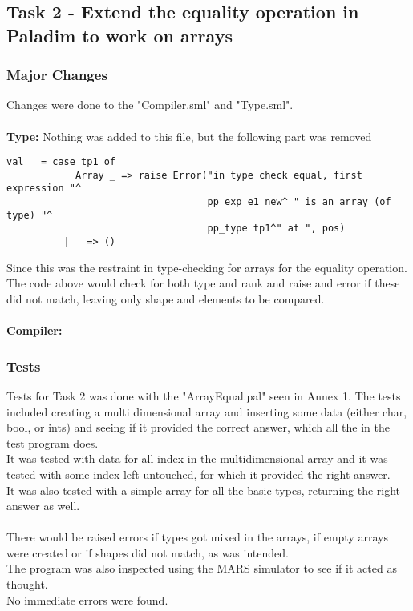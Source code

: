 \documentclass[12pt]{article}
\begin{document}
\newpage

\subsection*{Task 2 - Extend the equality operation in Paladim to work on arrays}
\subsubsection*{Major Changes}
Changes were done to the "Compiler.sml" and "Type.sml".\\
\\
\textbf{Type:} Nothing was added to this file, but the following part was removed
\begingroup
    \fontsize{9pt}{12pt}\selectfont
    \begin{verbatim}  
val _ = case tp1 of
            Array _ => raise Error("in type check equal, first expression "^
                                   pp_exp e1_new^ " is an array (of type) "^
                                   pp_type tp1^" at ", pos)
          | _ => ()
    \end{verbatim}  
\endgroup
Since this was the restraint in type-checking for arrays for the equality operation. The code above would check for both type and rank and raise and error if these did not match, leaving only shape and elements to be compared.\\
\\
\textbf{Compiler:} 
\subsubsection*{Tests}
Tests for Task 2 was done with the "ArrayEqual.pal" seen in Annex 1. The tests included creating a multi dimensional array and inserting some data (either char, bool, or ints) and seeing if it provided the correct answer, which all the in the test program does.\\
It was tested with data for all index in the multidimensional array and it was tested with some index left untouched, for which it provided the right answer.\\
It was also tested with a simple array for all the basic types, returning the right answer as well.\\
\\
There would be raised errors if types got mixed in the arrays, if empty arrays were created or if shapes did not match, as was intended.\\
The program was also inspected using the MARS simulator to see if it acted as thought. \\
No immediate errors were found.
\newpage
\end{document}
